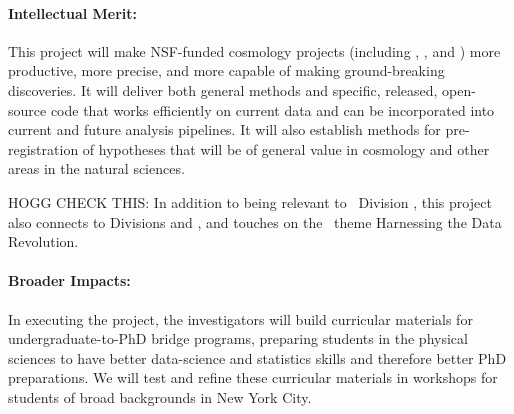 \documentclass[12pt, fullpage, letterpaper]{article}
\begin{document}
\paragraph{Intellectual Merit:}
This project will make NSF-funded cosmology projects (including
\SDSSIV, \DESI, and \LSST) more productive, more precise, and more
capable of making ground-breaking discoveries.
It will deliver both general methods and specific, released,
open-source code that works efficiently on current data and can be
incorporated into current and future analysis pipelines.
It will also establish methods for pre-registration of hypotheses that
will be of general value in cosmology and other areas in the natural
sciences.

HOGG CHECK THIS:
In addition to being relevant to \NSF\ Division , this project also
connects to Divisions  and , and touches on the \NSF\ theme
Harnessing the Data Revolution.

\paragraph{Broader Impacts:}
In executing the project, the investigators will build curricular
materials for undergraduate-to-PhD bridge programs, preparing students
in the physical sciences to have better data-science and statistics
skills and therefore better PhD preparations.
We will test and refine these curricular materials in workshops for
students of broad backgrounds in New York City.
\end{document}
